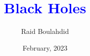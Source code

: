 \documentclass[15p,dvipsnames]{article}
\title{\textcolor{blue}{\textbf{Black Holes}}}
\author{Raid Boulahdid}
\date{February, 2023}
\begin{document}
	

	\tableofcontents
	
	\pagebreak

		

		
	
	
\end{document}
